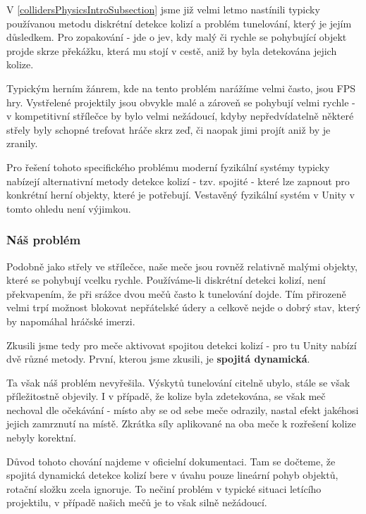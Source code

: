 V \ref{collidersPhysicsIntroSubsection} jsme již velmi letmo nastínili typicky používanou metodu diskrétní detekce kolizí a problém tunelování, který je jejím důsledkem. Pro zopakování - jde o jev, kdy malý či rychle se pohybující objekt projde skrze překážku, která mu stojí v cestě, aniž by byla detekována jejich kolize.

Typickým herním žánrem, kde na tento problém narážíme velmi často, jsou \acs{FPS} hry. Vystřelené projektily jsou obvykle malé a zároveň se pohybují velmi rychle - v kompetitivní střílečce by bylo velmi nežádoucí, kdyby nepředvídatelně některé střely byly schopné trefovat hráče skrz zeď, či naopak jimi projít aniž by je zranily.  

Pro řešení tohoto specifického problému moderní fyzikální systémy typicky nabízejí alternativní metody detekce kolizí - tzv. spojité - které lze zapnout pro konkrétní herní objekty, které je potřebují. Vestavěný fyzikální systém v Unity v tomto ohledu není výjimkou.


\subsubsection*{Náš problém}

Podobně jako střely ve střílečce, naše meče jsou rovněž relativně malými objekty, které se pohybují vcelku rychle. Používáme-li diskrétní detekci kolizí, není překvapením, že při srážce dvou mečů často k tunelování dojde. Tím přirozeně velmi trpí možnost blokovat nepřátelské údery a celkově nejde o dobrý stav, který by napomáhal hráčské imerzi.

\bigbreak

Zkusili jsme tedy pro meče aktivovat spojitou detekci kolizí - pro tu Unity nabízí dvě různé metody. První, kterou jsme zkusili, je \textbf{spojitá dynamická}.

Ta však náš problém nevyřešila. Výskytů tunelování citelně ubylo, stále se však příležitostně objevily. I v případě, že kolize byla zdetekována, se však meč nechoval dle očekávání - místo aby se od sebe meče odrazily, nastal efekt jakéhosi jejich zamrznutí na místě. Zkrátka síly aplikované na oba meče k rozřešení kolize nebyly korektní.

Důvod tohoto chování najdeme v oficielní dokumentaci. Tam se dočteme, že spojitá dynamická detekce kolizí bere v úvahu pouze lineární pohyb objektů, rotační složku zcela ignoruje. To nečiní problém v typické situaci letícího projektilu, v případě našich mečů je to však silně nežádoucí.  

